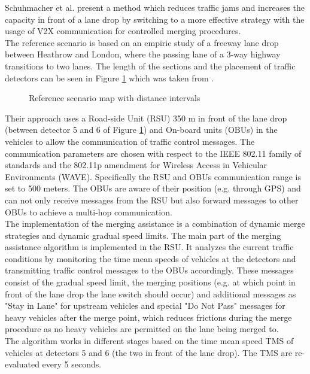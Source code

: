 \documentclass{sig-alternate}
\begin{document}
Schuhmacher et al. present a method which reduces traffic jams and increases the capacity in front of a lane drop by switching to a more effective strategy with the usage of V2X communication for controlled merging procedures.\\ The reference scenario is based on an empiric study\cite{bertini2005empirical} of a freeway lane drop between Heathrow and London, where the passing lane of a 3-way highway transitions to two lanes. The length of the sections and the placement of traffic detectors can be seen in Figure \ref{fig:schuhmacher1} which was taken from \cite {1614269.1614274}. \\
\begin{figure} 
\centering
{}
\caption{Reference scenario map with distance intervals}
\label{fig:schuhmacher1}
\end{figure}
Their approach uses a Road-side Unit (RSU) 350 m in front of the lane drop (between detector 5 and 6 of Figure \ref{fig:schuhmacher1}) and On-board units (OBUs) in the vehicles to allow the communication of traffic control messages. The communication parameters are chosen with respect to the IEEE 802.11 family of standards and the 802.11p amendment for Wireless Access in Vehicular Environments (WAVE). Specifically the RSU and OBUs communication range is set to 500 meters. The OBUs are aware of their position (e.g. through GPS) and can not only receive messages from the RSU but also forward messages to other OBUs to achieve a multi-hop communication. \\
The implementation of the merging assistance is a combination of dynamic merge strategies and dynamic gradual speed limits. The main part of the merging assistance algorithm is implemented in the RSU. It analyzes the current traffic conditions by monitoring the time mean speeds of vehicles at the detectors and transmitting traffic control messages  to the OBUs accordingly. These messages consist of the gradual speed limit, the merging positions (e.g. at which point in front of the lane drop the lane switch should occur) and additional messages as "Stay in Lane"  for upstream vehicles and special  "Do Not Pass" messages for heavy vehicles after the merge point, which reduces frictions during the merge procedure as no heavy vehicles are permitted on the lane being merged to. \\
The algorithm works in different stages based on the time mean speed TMS of vehicles at detectors 5 and 6 (the two in front of the lane drop). The TMS are re-evaluated every 5 seconds.
\end{document}
